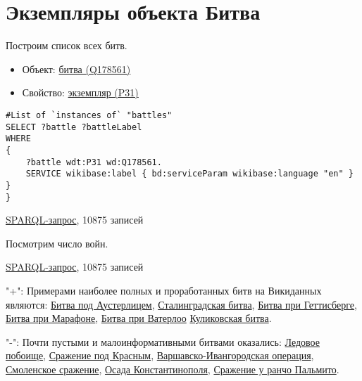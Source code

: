 \section{Экземпляры объекта Битва}
\begin{itemize}

Построим список всех битв.
\end{itemize}

\begin{itemize}
    \item Объект: \href{https://www.wikidata.org/wiki/Q178561}{битва (Q178561)}
    \item Свойство: \href{https://www.wikidata.org/wiki/Property:P31}{экземпляр (P31)}
\end{itemize}

\begin{lstlisting}[language=SPARQL  ]
#List of `instances of` "battles" 
SELECT ?battle ?battleLabel
WHERE
{
    ?battle wdt:P31 wd:Q178561.
    SERVICE wikibase:label { bd:serviceParam wikibase:language "en" }
}
}

\end{lstlisting}

\href{https://query.wikidata.org/#%23added%202017-02%0A%23List%20of%20%60instances%20of%60%20%22national%20park%22%20%0ASELECT%20%3Fbattle%20%3FbattleLabel%0AWHERE%0A%7B%0A%20%20%20%20%3Fbattle%20wdt%3AP31%20wd%3AQ178561.%0A%20%20%20%20SERVICE%20wikibase%3Alabel%20%7B%20bd%3AserviceParam%20wikibase%3Alanguage%20%22en%22%20%7D%0A%7D}{SPARQL-запрос}, 10875 записей

Посмотрим число войн.

\href{https://query.wikidata.org/#%23List%20of%20%60instances%20of%60%20%22war%22%20%0ASELECT%20%3Fwar%20%3FwarLabel%20WHERE%20%7B%0A%20%20%3Fwar%20wdt%3AP31%20wd%3AQ198.%0A%20%20SERVICE%20wikibase%3Alabel%20%7B%20bd%3AserviceParam%20wikibase%3Alanguage%20%22ru%22.%20%7D%0A%7D SPARQL-запрос}{SPARQL-запрос}, 10875 записей


"+": Примерами наиболее полных и проработанных битв на Викиданных являются:
\href{https://www.wikidata.org/wiki/Q134114}{Битва под Аустерлицем}, 
\href{https://www.wikidata.org/wiki/Q38789}{Сталинградская битва},
\href{https://www.wikidata.org/wiki/Q33132}{Битва при Геттисберге},
\href{https://www.wikidata.org/wiki/Q31900}{Битва при Марафоне},
\href{https://www.wikidata.org/wiki/Q48314}{Битва при Ватерлоо}
\href{https://www.wikidata.org/wiki/Q210354}{Куликовская битва}.

"-": Почти пустыми и малоинформативными битвами оказались:
\href{https://www.wikidata.org/wiki/Q14689}{Ледовое побоище},
\href{https://www.wikidata.org/wiki/Q25809}{Сражение под Красным},
\href{https://www.wikidata.org/wiki/Q28205}{Варшавско-Ивангородская операция},
\href{https://www.wikidata.org/wiki/Q1071578}{Смоленское сражение},
\href{https://www.wikidata.org/wiki/Q27900}{Осада Константинополя},
\href{https://www.wikidata.org/wiki/Q48776}{Сражение у ранчо Пальмито}.